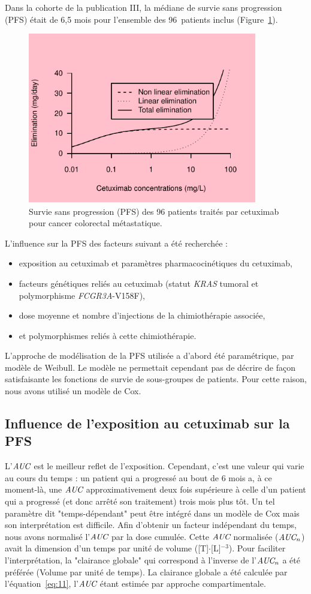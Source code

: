 Dans la cohorte de la publication III, la médiane de survie sans progression (PFS) était de 6,5 mois pour l'ensemble des 96~patients inclus (Figure~\ref{fig:23}). 
\begin{figure}[htbp]
	\centering
		\includegraphics[width=10cm]{images/essai001.pdf}
	\caption[PFS de 96 patients]{Survie sans progression (PFS) des 96 patients traités par cetuximab pour cancer colorectal métastatique.}
	\label{fig:23}
\end{figure}
L'influence sur la PFS des facteurs suivant a été recherchée :
\begin{itemize}
\item exposition au cetuximab et paramètres pharmacocinétiques du cetuximab,
\item facteurs génétiques reliés au cetuximab (statut \textit{KRAS} tumoral et polymorphisme \textit{FCGR3A}-V158F),
\item dose moyenne et nombre d'injections de la chimiothérapie associée,
\item et polymorphismes reliés à cette chimiothérapie.
\end{itemize}
L'approche de modélisation de la PFS utilisée a d'abord été paramétrique, par modèle de Weibull. Le modèle ne permettait cependant pas de décrire de façon satisfaisante les fonctions de survie de sous-groupes de patients. Pour cette raison, nous avons utilisé un modèle de Cox.
\subsection{Influence de l'exposition au cetuximab sur la PFS}
L'$\operatorname{\textit{AUC}}$ est le meilleur reflet de l'exposition. Cependant, c'est une valeur qui varie au cours du temps : un patient qui a progressé au bout de 6 mois a, à ce moment-là, une $\operatorname{\textit{AUC}}$ approximativement deux fois supérieure à celle d'un patient qui a progressé (et donc arrêté son traitement) trois mois plus tôt. Un tel paramètre dit "temps-dépendant" peut être intégré dans un modèle de Cox mais son interprétation est difficile. Afin d'obtenir un facteur indépendant du temps, nous avons normalisé l'$\operatorname{\textit{AUC}}$ par la dose cumulée. Cette $\operatorname{\textit{AUC}}$ normalisée ($\operatorname{\textit{AUC}}_n$) avait la dimension d'un temps par unité de volume ([T]$\cdot$[L]$^{-3}$). Pour faciliter l'interprétation, la "clairance globale" qui correspond à l'inverse de l'$\operatorname{\textit{AUC}}_n$ a été préférée (Volume par unité de temps). La clairance globale a été calculée par l'équation~\ref{eq:11}, l'$\operatorname{\textit{AUC}}$ étant estimée par approche compartimentale.

